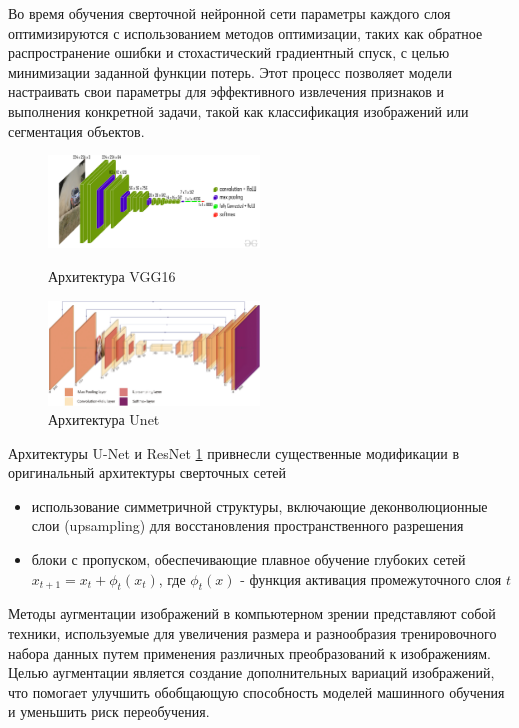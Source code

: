 Во время обучения сверточной нейронной сети параметры каждого слоя оптимизируются с использованием методов оптимизации, таких как обратное распространение ошибки и стохастический градиентный спуск, с целью минимизации заданной функции потерь. Этот процесс позволяет модели настраивать свои параметры для эффективного извлечения признаков и выполнения конкретной задачи, такой как классификация изображений или сегментация объектов.

\begin{figure}[h]
    \centering
    \includegraphics[width=0.5\textwidth]{assets/ml/cv/vgg16.jpg}
    \caption{Архитектура VGG16 \cite{simonyan2014very}}
    \includegraphics[width=0.5\textwidth]{assets/ml/cv/unet.png}
    \caption{Архитектура Unet \cite{ronneberger2015u}}
    \label{vgg_arch}
\end{figure}


Архитектуры U-Net  и ResNet \ref{vgg_arch} привнесли 
существенные модификации в оригинальный архитектуры сверточных сетей \begin{itemize}
    \item использование симметричной структуры, 
    включающие деконволюционные слои (upsampling) для восстановления пространственного разрешения
    \item блоки с пропуском, обеспечивающие плавное обучение глубоких сетей  $x_{t+1} = x_t + \phi_t(x_t)$, где $\phi_t(x)$ - функция активация промежуточного слоя $t$
\end{itemize}

Методы аугментации изображений в компьютерном зрении представляют собой техники,
используемые для увеличения размера и разнообразия тренировочного набора данных путем применения различных преобразований к изображениям. 
Целью аугментации является создание дополнительных вариаций изображений, что помогает улучшить обобщающую способность моделей машинного обучения и уменьшить риск переобучения.


